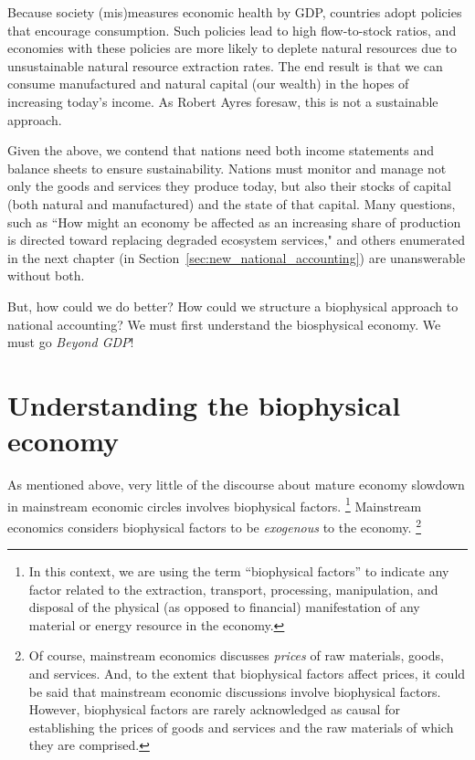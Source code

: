 Because society (mis)measures economic health by GDP, 
countries adopt policies that encourage consumption.
Such policies lead to high flow-to-stock ratios,
and economies with these policies are more likely to deplete natural resources 
due to unsustainable natural resource extraction rates.
The end result is that we can consume manufactured and natural capital (our wealth) 
in the hopes of increasing today's income. 
As Robert Ayres foresaw, this is not 
a sustainable approach.

Given the above, we contend that nations need both 
income statements and
balance sheets
to ensure sustainability. 
Nations must monitor and manage not only the goods and services they produce today, 
but also their stocks of capital (both natural and manufactured)
and the state of that capital. 
Many questions, such as 
``How might an economy be affected as an increasing share of production
is directed toward replacing 
degraded ecosystem services," 
and others enumerated in the next chapter (in Section~\ref{sec:new_national_accounting})
are unanswerable without both.

But, how could we do better? 
How could we structure a biophysical approach to national accounting?
We must first understand the biosphysical economy.
We must go \emph{Beyond GDP}!


\section{Understanding the biophysical economy}
\label{sec:exogenous_factors}

As mentioned above, 
very little of the discourse 
about mature economy slowdown 
in mainstream economic circles
involves biophysical factors.%
	\footnote{
	In this context, we are using the term ``biophysical factors''
	to indicate any factor related to 
	the extraction, transport, processing, manipulation, and disposal 
	of the physical (as opposed to financial) manifestation 
	of any material or energy resource in the economy.
	}
Mainstream economics considers biophysical factors
to be \emph{exogenous} to the economy.%
	\footnote{
	Of course, mainstream economics discusses \emph{prices}
	of raw materials, goods, and services. 
	And, to the extent that biophysical factors affect prices,
	it could be said that mainstream economic discussions involve
	biophysical factors.
	However, biophysical factors are rarely acknowledged as causal 
	for establishing the prices of goods and services and the raw materials 
	of which they are comprised.
	}

